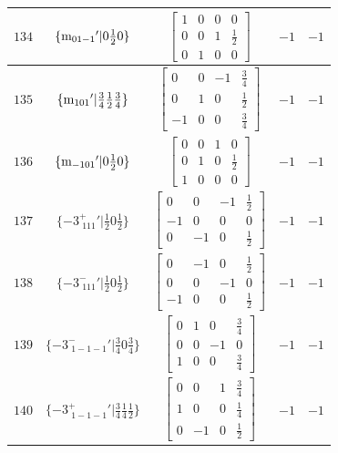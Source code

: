 \documentclass[fleqn,8pt]{jsarticle}
\begin{document}
\begin{longtable}{ccccc}
$ 134 $ & $ \{{\rm m}_{01-1}{}'|0 \frac{1}{2} 0\} $ & $ \begin{bmatrix} 1 & 0 & 0 & 0 \\ 0 & 0 & 1 & \frac{1}{2} \\ 0 & 1 & 0 & 0 \end{bmatrix} $ & $ -1 $ & $ -1 $ \\ \hline
$ 135 $ & $ \{{\rm m}_{101}{}'|\frac{3}{4} \frac{1}{2} \frac{3}{4}\} $ & $ \begin{bmatrix} 0 & 0 & -1 & \frac{3}{4} \\ 0 & 1 & 0 & \frac{1}{2} \\ -1 & 0 & 0 & \frac{3}{4} \end{bmatrix} $ & $ -1 $ & $ -1 $ \\ \hline
$ 136 $ & $ \{{\rm m}_{-101}{}'|0 \frac{1}{2} 0\} $ & $ \begin{bmatrix} 0 & 0 & 1 & 0 \\ 0 & 1 & 0 & \frac{1}{2} \\ 1 & 0 & 0 & 0 \end{bmatrix} $ & $ -1 $ & $ -1 $ \\ \hline
$ 137 $ & $ \{-3^{+}_{\,\,111}{}'|\frac{1}{2} 0 \frac{1}{2}\} $ & $ \begin{bmatrix} 0 & 0 & -1 & \frac{1}{2} \\ -1 & 0 & 0 & 0 \\ 0 & -1 & 0 & \frac{1}{2} \end{bmatrix} $ & $ -1 $ & $ -1 $ \\ \hline
$ 138 $ & $ \{-3^{-}_{\,\,111}{}'|\frac{1}{2} 0 \frac{1}{2}\} $ & $ \begin{bmatrix} 0 & -1 & 0 & \frac{1}{2} \\ 0 & 0 & -1 & 0 \\ -1 & 0 & 0 & \frac{1}{2} \end{bmatrix} $ & $ -1 $ & $ -1 $ \\ \hline
$ 139 $ & $ \{-3^{-}_{\,\,1-1-1}{}'|\frac{3}{4} 0 \frac{3}{4}\} $ & $ \begin{bmatrix} 0 & 1 & 0 & \frac{3}{4} \\ 0 & 0 & -1 & 0 \\ 1 & 0 & 0 & \frac{3}{4} \end{bmatrix} $ & $ -1 $ & $ -1 $ \\ \hline
$ 140 $ & $ \{-3^{+}_{\,\,1-1-1}{}'|\frac{3}{4} \frac{1}{4} \frac{1}{2}\} $ & $ \begin{bmatrix} 0 & 0 & 1 & \frac{3}{4} \\ 1 & 0 & 0 & \frac{1}{4} \\ 0 & -1 & 0 & \frac{1}{2} \end{bmatrix} $ & $ -1 $ & $ -1 $ \\ \hline

\end{longtable}
\end{document}
